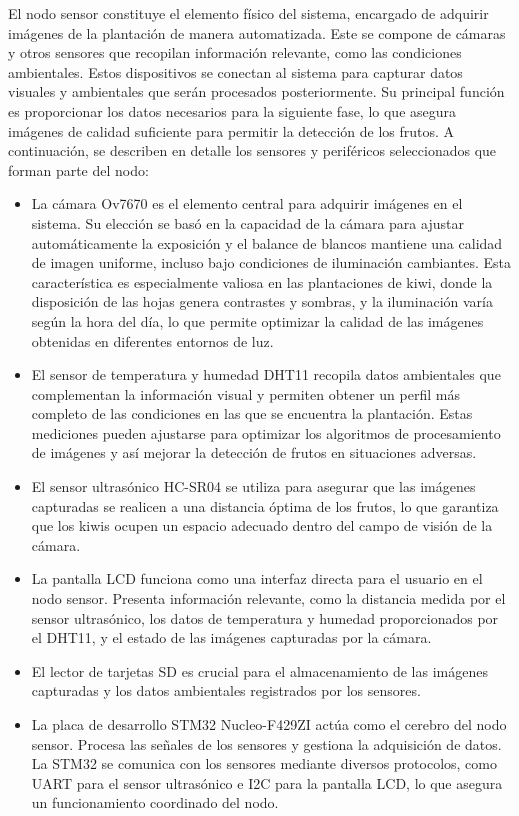 El nodo sensor constituye el elemento físico del sistema, encargado de adquirir imágenes de la plantación de manera automatizada. Este se compone de cámaras y otros sensores que recopilan información relevante, como las condiciones ambientales. Estos dispositivos se conectan al sistema para capturar datos visuales y ambientales que serán procesados posteriormente. Su principal función es proporcionar los datos necesarios para la siguiente fase, lo que asegura imágenes de calidad suficiente para permitir la detección de los frutos. A continuación, se describen en detalle los sensores y periféricos seleccionados que forman parte del nodo:

\begin{itemize}
\item La cámara Ov7670 es el elemento central para adquirir imágenes en el sistema. Su elección se basó en la capacidad de la cámara para ajustar automáticamente la exposición y el balance de blancos mantiene una calidad de imagen uniforme, incluso bajo condiciones de iluminación cambiantes. Esta característica es especialmente valiosa en las plantaciones de kiwi, donde la disposición de las hojas genera contrastes y sombras, y la iluminación varía según la hora del día, lo que permite optimizar la calidad de las imágenes obtenidas en diferentes entornos de luz.

\item El sensor de temperatura y humedad DHT11 recopila datos ambientales que complementan la información visual y  permiten obtener un perfil más completo de las condiciones en las que se encuentra la plantación. Estas mediciones pueden ajustarse para optimizar los algoritmos de procesamiento de imágenes y así mejorar la detección de frutos en situaciones adversas.
\item El sensor ultrasónico HC-SR04 se utiliza para asegurar que las imágenes capturadas se realicen a una distancia óptima de los frutos, lo que garantiza que los kiwis ocupen un espacio adecuado dentro del campo de visión de la cámara.
\item La pantalla LCD funciona como una interfaz directa para el usuario en el nodo sensor. Presenta información relevante, como la distancia medida por el sensor ultrasónico, los datos de temperatura y humedad proporcionados por el DHT11, y el estado de las imágenes capturadas por la cámara.
\item El lector de tarjetas SD es crucial para el almacenamiento de las imágenes capturadas y los datos ambientales registrados por los sensores.
\item La placa de desarrollo STM32 Nucleo-F429ZI actúa como el cerebro del nodo sensor. Procesa las señales de los sensores y gestiona la adquisición de datos. La STM32 se comunica con los sensores mediante diversos protocolos, como UART para el sensor ultrasónico e I2C para la pantalla LCD, lo que asegura un funcionamiento coordinado del nodo.
\end{itemize}


